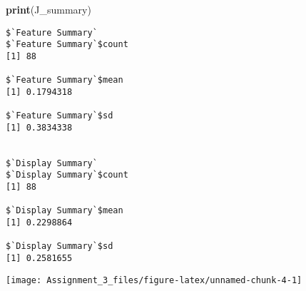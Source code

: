 \documentclass[]{article}
\newenvironment{Shaded}{\begin{snugshade}}{\end{snugshade}}
\newcommand{\DataTypeTok}[1]{\textcolor[rgb]{0.13,0.29,0.53}{#1}}
\newcommand{\KeywordTok}[1]{\textcolor[rgb]{0.13,0.29,0.53}{\textbf{#1}}}
\newcommand{\NormalTok}[1]{#1}
\newcommand{\OperatorTok}[1]{\textcolor[rgb]{0.81,0.36,0.00}{\textbf{#1}}}
\newcommand{\StringTok}[1]{\textcolor[rgb]{0.31,0.60,0.02}{#1}}
\begin{document}
\begin{Shaded}
\begin{Highlighting}[]
\KeywordTok{print}\NormalTok{(J_summary)}
\end{Highlighting}
\end{Shaded}

\begin{verbatim}
$`Feature Summary`
$`Feature Summary`$count
[1] 88

$`Feature Summary`$mean
[1] 0.1794318

$`Feature Summary`$sd
[1] 0.3834338


$`Display Summary`
$`Display Summary`$count
[1] 88

$`Display Summary`$mean
[1] 0.2298864

$`Display Summary`$sd
[1] 0.2581655
\end{verbatim}

\begin{Shaded}
\end{Shaded}

\begin{center}\texttt{[image: Assignment\_3\_files/figure-latex/unnamed-chunk-4-1]} \end{center}

\begin{Shaded}
\end{Shaded}
\end{document}
